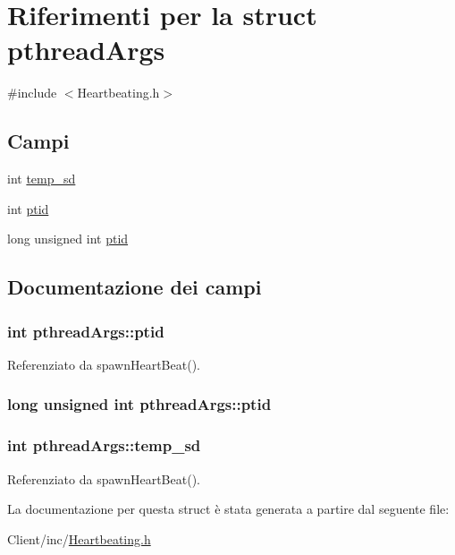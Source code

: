 \hypertarget{structpthreadArgs}{\section{Riferimenti per la struct pthread\+Args}
\label{structpthreadArgs}
}


{\ttfamily \#include $<$Heartbeating.\+h$>$}

\subsection*{Campi}
\begin{DoxyCompactItemize}
\item 
int \hyperlink{structpthreadArgs_a028f49dcb3a6ed77870caacec6f2b968}{temp\+\_\+sd}
\item 
int \hyperlink{structpthreadArgs_abc763a99a614f8e00c11fbbece336516}{ptid}
\item 
long unsigned int \hyperlink{structpthreadArgs_a124b4bdead648caebf7ac91e41fef5dc}{ptid}
\end{DoxyCompactItemize}


\subsection{Documentazione dei campi}
\hypertarget{structpthreadArgs_abc763a99a614f8e00c11fbbece336516}{
\subsubsection[{ptid}]{\setlength{\rightskip}{0pt plus 5cm}int pthread\+Args\+::ptid}}\label{structpthreadArgs_abc763a99a614f8e00c11fbbece336516}


Referenziato da spawn\+Heart\+Beat().

\hypertarget{structpthreadArgs_a124b4bdead648caebf7ac91e41fef5dc}{
\subsubsection[{ptid}]{\setlength{\rightskip}{0pt plus 5cm}long unsigned int pthread\+Args\+::ptid}}\label{structpthreadArgs_a124b4bdead648caebf7ac91e41fef5dc}
\hypertarget{structpthreadArgs_a028f49dcb3a6ed77870caacec6f2b968}{
\subsubsection[{temp\+\_\+sd}]{\setlength{\rightskip}{0pt plus 5cm}int pthread\+Args\+::temp\+\_\+sd}}\label{structpthreadArgs_a028f49dcb3a6ed77870caacec6f2b968}


Referenziato da spawn\+Heart\+Beat().



La documentazione per questa struct è stata generata a partire dal seguente file\+:\begin{DoxyCompactItemize}
\item 
Client/inc/\hyperlink{Client_2inc_2Heartbeating_8h}{Heartbeating.\+h}\end{DoxyCompactItemize}
